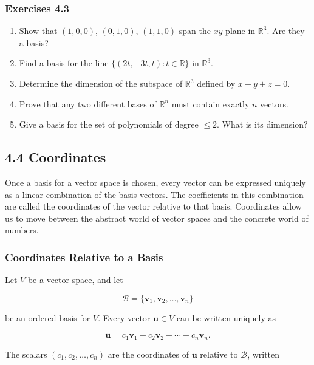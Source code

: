 \documentclass[
  12pt,
  a4paper,
]{article}
\begin{document}
\subsubsection{Exercises 4.3}\label{exercises-43}

\begin{enumerate}
\def\labelenumi{\arabic{enumi}.}
\item
  Show that \((1,0,0)\), \((0,1,0)\), \((1,1,0)\) span the \(xy\)-plane
  in \(\mathbb{R}^3\). Are they a basis?
\item
  Find a basis for the line \(\{(2t,-3t,t) : t \in \mathbb{R}\}\) in
  \(\mathbb{R}^3\).
\item
  Determine the dimension of the subspace of \(\mathbb{R}^3\) defined by
  \(x+y+z=0\).
\item
  Prove that any two different bases of \(\mathbb{R}^n\) must contain
  exactly \(n\) vectors.
\item
  Give a basis for the set of polynomials of degree \(\leq 2\). What is
  its dimension?
\end{enumerate}

\subsection{4.4 Coordinates}\label{44-coordinates}

Once a basis for a vector space is chosen, every vector can be expressed
uniquely as a linear combination of the basis vectors. The coefficients
in this combination are called the coordinates of the vector relative to
that basis. Coordinates allow us to move between the abstract world of
vector spaces and the concrete world of numbers.

\subsubsection{Coordinates Relative to a
Basis}\label{coordinates-relative-to-a-basis}

Let \(V\) be a vector space, and let

\[\mathcal{B} = \{\mathbf{v}_1, \mathbf{v}_2, \dots, \mathbf{v}_n\}\]

be an ordered basis for \(V\). Every vector \(\mathbf{u} \in V\) can be
written uniquely as

\[\mathbf{u} = c_1 \mathbf{v}_1 + c_2 \mathbf{v}_2 + \cdots + c_n \mathbf{v}_n.\]

The scalars \((c_1, c_2, \dots, c_n)\) are the coordinates of
\(\mathbf{u}\) relative to \(\mathcal{B}\), written
\end{document}
